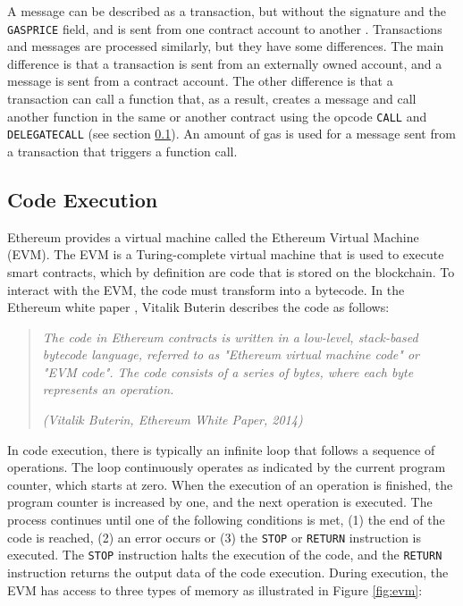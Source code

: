 A message can be described as a transaction, but without the signature and the \texttt{GASPRICE} field, and is sent from one contract account to another
. Transactions and messages are processed similarly, but they have some differences. The main difference
is that a transaction is sent from an externally owned account, and a message is sent from a contract account. The other difference is that a transaction
can call a function that, as a result, creates a message and call another function in the same or another contract using the opcode \texttt{CALL} and \texttt{DELEGATECALL}
(see section \ref{sec:evm}). An amount of gas is used for a message sent from a transaction that triggers a function call.


\subsection{Code Execution}
\label{sec:evm}


Ethereum provides a virtual machine called the Ethereum Virtual Machine (EVM). The EVM is a Turing-complete virtual machine that is used to execute
smart contracts, which by definition are code that is stored on the blockchain. To interact with the EVM, the code must transform into a bytecode.
In the Ethereum white paper \cite{ethereum_white_paper}, Vitalik Buterin describes the code as follows:


\begin{quote}
   \textit{The code in Ethereum contracts is written in a low-level, stack-based bytecode language, referred to as "Ethereum virtual machine code" or "EVM code". The code consists of a series of bytes, where each byte represents an operation.}


   \textit{(Vitalik Buterin, Ethereum White Paper, 2014)}
\end{quote}


In code execution, there is typically an infinite loop that follows a sequence of operations. The loop continuously operates as indicated
by the current program counter, which starts at zero. When the execution of an operation is finished, the program counter is increased by one, and the next
operation is executed. The process continues until one of the following conditions is met, (1) the end of the code is reached, (2) an error occurs or
(3) the \texttt{STOP} or \texttt{RETURN} instruction is executed. The \texttt{STOP} instruction halts the execution of the code, and the \texttt{RETURN} instruction
returns the output data of the code execution. During execution, the EVM has access to three types of memory as illustrated in Figure \ref{fig:evm}:


